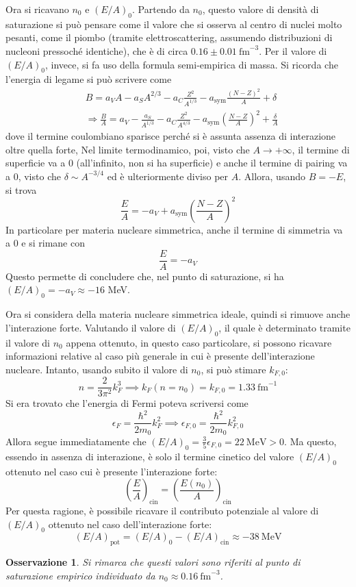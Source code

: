 \documentclass[11pt, a4paper]{scrartcl}
\theoremstyle{style}
\newtheorem{osservazione}{Osservazione}[section]
\numberwithin{equation}{subsection}
\begin{document}
Ora si ricavano $n_0$ e $(E / A)_0$.
Partendo da $n_0$, questo valore di densit\`a di saturazione si pu\`o pensare come il valore che si osserva al centro di nuclei molto pesanti, come il piombo (tramite elettroscattering, assumendo distribuzioni di nucleoni pressoch\'e identiche), che \`e di circa $0.16 \pm 0.01~\text{fm}^{-3}$.
Per il valore di $(E / A)_0$, invece, si fa uso della formula semi-empirica di massa.
Si ricorda che l'energia di legame si pu\`o scrivere come
\[
	\begin{split}
		&B = a_V A - a_S A^{2 / 3} - a_C \frac{Z^2}{A^{1 / 3}} - a_\text{sym} \frac{(N-Z)^2}{A} + \delta \\
		&\Rightarrow \frac{B}{A} = a_V - \frac{a_S}{A^{1 / 3}} - a_C \frac{Z^2}{A^{4 / 3}} - a_\text{sym} \left(\frac{N-Z}{A}\right) ^2 + \frac{\delta }{A}
	\end{split}
\] 
dove il termine coulombiano sparisce perch\'e si \`e assunta assenza di interazione oltre quella forte,
Nel limite termodinamico, poi, visto che $A \to +\infty$, il termine di superficie va a $0$ (all'infinito, non si ha superficie) e anche il termine di pairing va a $0$, visto che $\delta \sim A^{-3 / 4}$ ed \`e ulteriormente diviso per $A$.
Allora, usando $B = -E$, si trova
\[
\frac{E}{A} = - a_V + a_\text{sym} \left(\frac{N-Z}{A}\right) ^2
\] 
In particolare per materia nucleare simmetrica, anche il termine di simmetria va a $0$ e si rimane con 
\[
\frac{E}{A} = - a_V
\] 
Questo permette di concludere che, nel punto di saturazione, si ha $(E/A)_0 = -a_V \approx - 16$ MeV.

Ora si considera della materia nucleare simmetrica ideale, quindi si rimuove anche l'interazione forte. 
Valutando il valore di $(E / A)_0$, il quale \`e determinato tramite il valore di $n_0$ appena ottenuto, in questo caso particolare, si possono ricavare informazioni relative al caso pi\`u generale in cui \`e presente dell'interazione nucleare.
Intanto, usando subito il valore di $n_0$, si pu\`o stimare $k_{F,0}$:
\[
n = \frac{2}{3\pi^2} k_F^3 \implies k_F(n=n_0) = k_{F,0} = 1.33~\text{fm}^{-1}
\] 
Si era trovato che l'energia di Fermi poteva scriversi come
\[
\epsilon _F = \frac{\hbar ^2}{2m_0}k_{F}^2 \implies \epsilon _{F,0} = \frac{\hbar ^2}{2m_0} k_{F,0}^2
\] 
Allora segue immediatamente che $(E / A)_0 = \frac{3}{5} \epsilon _{F,0} = 22~\text{MeV} > 0$.
Ma questo, essendo in assenza di interazione, \`e solo il termine cinetico del valore $(E / A)_0$ ottenuto nel caso cui \`e presente l'interazione forte:
\[
\left(\frac{E}{A}\right) _\text{cin} =\left( \frac{E(n_0)}{A}\right) _\text{cin}
\] 
Per questa ragione, \`e possibile ricavare il contributo potenziale al valore di $(E / A)_0$ ottenuto nel caso dell'interazione forte:
\[
	(E / A)_\text{pot} = (E/A)_0 - (E / A)_\text{cin} \approx - 38~\text{MeV}
\] 
\begin{osservazione}
Si rimarca che questi valori sono riferiti al punto di saturazione empirico individuato da $n_0 \approx 0.16~\text{fm}^{-3}$.
\end{osservazione}
\end{document}
